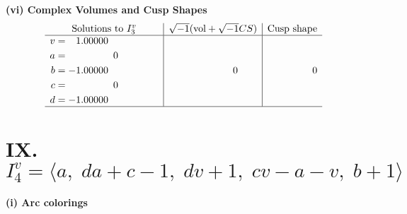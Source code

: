 \documentclass[1p]{elsarticle_modified}
\theoremstyle{definition}
\newcommand{\I}{\sqrt{-1}}
\begin{document}
\newpage\flushleft \textbf{(vi) Complex Volumes and Cusp Shapes}
$$\begin{array}{c|c|c}  
\text{Solutions to }I^v_{3}& \I (\text{vol} + \sqrt{-1}CS) & \text{Cusp shape}\\
 \hline 
\begin{aligned}
v &= \phantom{-}1.00000\phantom{ +0.000000I} \\
a &= \phantom{-0.000000 } 0 \\
b &= -1.00000\phantom{ +0.000000I} \\
c &= \phantom{-0.000000 } 0 \\
d &= -1.00000\phantom{ +0.000000I}\end{aligned}
 & \phantom{-0.000000 } 0 & \phantom{-0.000000 } 0\\
 \hline 
 \end{array}$$\newpage\newpage\renewcommand{\arraystretch}{1}
\centering \section*{IX. $I^v_{4}= \langle a,\;d a+c-1,\;d v+1,\;c v- a- v,\;b+1 \rangle$}
\flushleft \textbf{(i) Arc colorings}\\
\end{document}
